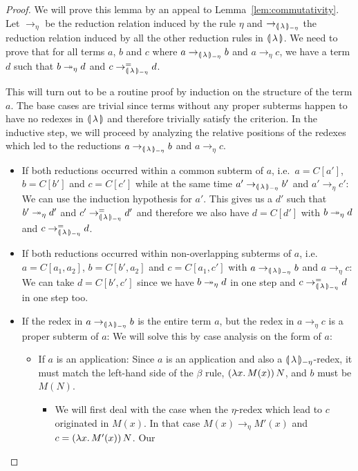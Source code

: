 \begin{proof}
  We will prove this lemma by an appeal to
  Lemma~\ref{lem:commutativity}. Let $\to_\eta$ be the reduction relation
  induced by the rule $\eta$ and $\to_{{\llparenthesis \, \lambda \, \rrparenthesis_{-\eta}}}$ the reduction
  relation induced by all the other reduction rules in
  $\llparenthesis \, \lambda \, \rrparenthesis$. We need to prove that for all terms $a$, $b$ and $c$
  where $a \to_{{\llparenthesis \, \lambda \, \rrparenthesis_{-\eta}}} b$ and $a \to_\eta c$, we have a term $d$ such that
  $b \twoheadrightarrow_\eta d$ and $c \to_{{\llparenthesis \, \lambda \, \rrparenthesis_{-\eta}}}^= d$.

  This will turn out to be a routine proof by induction on the structure of
  the term $a$. The base cases are trivial since terms without any proper
  subterms happen to have no redexes in $\llparenthesis \, \lambda \, \rrparenthesis$ and therefore
  trivially satisfy the criterion. In the inductive step, we will proceed
  by analyzing the relative positions of the redexes which led to the
  reductions $a \to_{{\llparenthesis \, \lambda \, \rrparenthesis_{-\eta}}} b$ and $a \to_\eta c$.
  \begin{itemize}
  \item If both reductions occurred within a common subterm of $a$, i.e.\
    $a = C[a']$, $b = C[b']$ and $c = C[c']$ while at the same time
    $a' \to_{{\llparenthesis \, \lambda \, \rrparenthesis_{-\eta}}} b'$ and $a' \to_\eta c'$: We can use the induction
    hypothesis for $a'$. This gives us a $d'$ such that $b' \twoheadrightarrow_\eta d'$
    and $c' \to_{{\llparenthesis \, \lambda \, \rrparenthesis_{-\eta}}}^= d'$ and therefore we also have $d = C[d']$ with
    $b \twoheadrightarrow_\eta d$ and $c \to_{{\llparenthesis \, \lambda \, \rrparenthesis_{-\eta}}}^= d$.
  \item If both reductions occurred within non-overlapping subterms of $a$,
    i.e.\ $a = C[a_1, a_2]$, $b = C[b', a_2]$ and $c = C[a_1, c']$ with
    $a \to_{{\llparenthesis \, \lambda \, \rrparenthesis_{-\eta}}} b$ and $a \to_\eta c$: We can take $d = C[b', c']$ since
    we have $b \twoheadrightarrow_\eta d$ in one step and $c \to_{{\llparenthesis \, \lambda \, \rrparenthesis_{-\eta}}}^= d$ in one step
    too.
  \item If the redex in $a \to_{{\llparenthesis \, \lambda \, \rrparenthesis_{-\eta}}} b$ is the entire term $a$, but the
    redex in $a \to_\eta c$ is a proper subterm of $a$: We will solve this
    by case analysis on the form of $a$:
    \begin{itemize}
    \item If $a$ is an application: Since $a$ is an application and also a
      ${\llparenthesis \, \lambda \, \rrparenthesis_{-\eta}}$-redex, it must match the left-hand side of the $\beta$
      rule, $(\lambda x.\, M(x))\,N$, and $b$ must be $M(N)$.
      \begin{itemize}
      \item We will first deal with the case when the $\eta$-redex which
        lead to $c$ originated in $M(x)$. In that case
        $M(x) \to_\eta M'(x)$ and $c = (\lambda x.\, M'(x))\,N$. Our

\end{itemize}
\end{itemize}
\end{itemize}
\end{proof}
